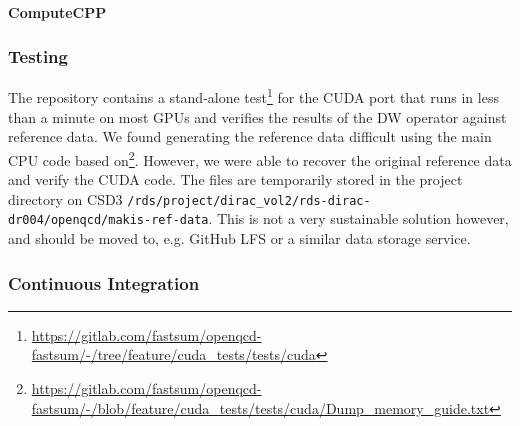 \documentclass[../main]{subfiles}
\begin{document}
\paragraph{ComputeCPP}


\subsubsection{Testing}\label{testing_openqcd}

The repository contains a stand-alone test\footnote{\url{https://gitlab.com/fastsum/openqcd-fastsum/-/tree/feature/cuda_tests/tests/cuda}} for the CUDA port that runs in less than a minute on most GPUs and verifies the results of the DW operator against reference data.
We found generating the reference data difficult using the main CPU code based on\footnote{\url{https://gitlab.com/fastsum/openqcd-fastsum/-/blob/feature/cuda_tests/tests/cuda/Dump\_memory\_guide.txt}}.
However, we were able to recover the original reference data and verify the CUDA code.
The files are temporarily stored in the project directory on CSD3 \texttt{/rds/project/dirac\_vol2/rds-dirac-dr004/openqcd/makis-ref-data}.
This is not a very sustainable solution however, and should be moved to, e.g. GitHub LFS or a similar data storage service. %

\subsubsection{Continuous Integration}
\end{document}
